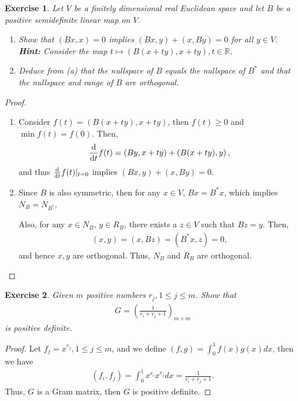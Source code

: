 \documentclass[11pt]{book}
\newtheorem{exercise}{Exercise}[section]
\theoremstyle{definition}
\numberwithin{equation}{chapter}
\begin{document}
\begin{exercise}
Let $V$ be a finitely dimensional real Euclidean space and let $B$ be a positive semidefinite linear map on $V$.
\begin{enumerate}[label=(\alph*)]
    \item Show that $(Bx, x) = 0$ implies $(Bx, y) + (x, By) = 0$ for all $y \in V$. {\bf Hint:} Consider the map $t \mapsto (B(x+ty), x+ty), t \in \mathbb{R}$.
    
    \item Deduce from (a) that the nullspace of $B$ equals the nullspace of $B^*$ and that the nullspace and range of $B$ are orthogonal.
\end{enumerate}
\end{exercise}
\begin{proof}
~\begin{enumerate}[label=(\alph*)]
    \item Consider $f(t) = (B(x+ty), x+ty)$, then $f(t) \geq 0$ and $\min f(t) = f(0)$. Then, 
    \begin{align*}
        \dv{}{t} f(t) = \left(By, x+ty\right) + \left(B(x+ty), y\right),
    \end{align*}
    and thus $\dv{}{t} f(t)|_{t=0}$ implies $(Bx, y) + (x, By) = 0$.
    
    \item Since $B$ is also symmetric, then for any $x \in V$, $Bx = B^*x$, which implies $N_B = N_{B^*}$.
    
    Also, for any $x \in N_B$, $y \in R_B$, there exists a $z \in V$ such that $Bz = y$. Then, 
    \begin{align*}
        (x,y) = (x, Bz) = (B^*x, z) = 0,
    \end{align*}
    and hence $x, y$ are orthogonal. Thus, $N_B$ and $R_B$ are orthogonal.
\end{enumerate}
\end{proof}

\medskip

\begin{exercise}
Given $m$ positive numbers $r_j, 1\leq j \leq m$. Show that 
\begin{align*}
    G = \left(\frac{1}{r_i + r_j + 1}\right)_{m\times m}
\end{align*}
is positive definite.
\end{exercise}
\begin{proof}
Let $f_j = x^{r_j}, 1\leq j \leq m$, and we define $(f,g) = \int^1_0 f(x)g(x)dx$, then we have 
\begin{align*}
    (f_i, f_j) = \int^1_0 x^{r_i}x^{r_j}dx = \frac{1}{r_i + r_j + 1}.
\end{align*}
Thus, $G$ is a Gram matrix, then $G$ is positive definite.
\end{proof}
\end{document}
